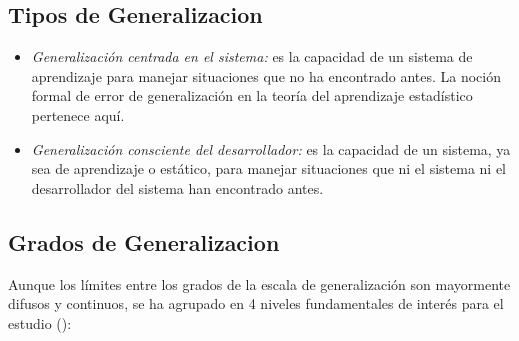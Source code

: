 \subsection{Tipos de Generalizacion}\label{section:state-of-the-art:generalization-on-machine-learning:type-of-generalizations}

\begin{itemize}
\item \textit{Generalización centrada en el sistema:} es la capacidad de un sistema de aprendizaje para manejar situaciones que no ha encontrado antes. La noción formal de error de generalización en la teoría del aprendizaje estadístico pertenece aquí.

\item \textit{Generalización consciente del desarrollador:} es la capacidad de un sistema, ya sea de aprendizaje o estático, para manejar situaciones que ni el sistema ni el desarrollador del sistema han encontrado antes.
\end{itemize}

\subsection{Grados de Generalizacion}

Aunque los límites entre los grados de la escala de generalización son mayormente difusos y continuos, se ha agrupado en 4 niveles fundamentales de interés para el estudio (\cite{chollet2019measure}):

